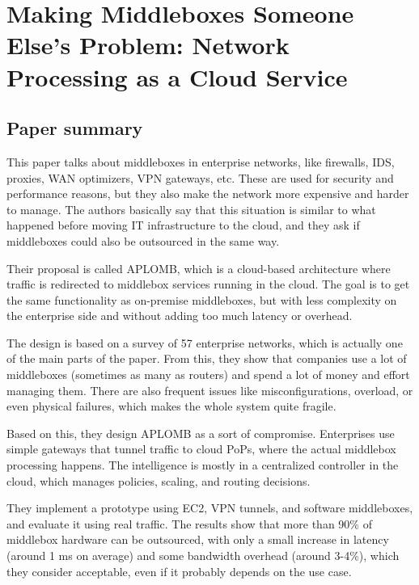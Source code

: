 \documentclass[a4paper, 12pt]{article}
\begin{document}
\section*{Making Middleboxes Someone Else's Problem:
Network Processing as a Cloud Service}
\subsection{Paper summary}

This paper talks about middleboxes in enterprise networks, like firewalls, IDS, proxies, WAN optimizers, VPN gateways, etc. These are used for security and performance reasons, but they also make the network more expensive and harder to manage. The authors basically say that this situation is similar to what happened before moving IT infrastructure to the cloud, and they ask if middleboxes could also be outsourced in the same way.

Their proposal is called APLOMB, which is a cloud-based architecture where traffic is redirected to middlebox services running in the cloud. The goal is to get the same functionality as on-premise middleboxes, but with less complexity on the enterprise side and without adding too much latency or overhead.

The design is based on a survey of 57 enterprise networks, which is actually one of the main parts of the paper. From this, they show that companies use a lot of middleboxes (sometimes as many as routers) and spend a lot of money and effort managing them. There are also frequent issues like misconfigurations, overload, or even physical failures, which makes the whole system quite fragile.

Based on this, they design APLOMB as a sort of compromise. Enterprises use simple gateways that tunnel traffic to cloud PoPs, where the actual middlebox processing happens. The intelligence is mostly in a centralized controller in the cloud, which manages policies, scaling, and routing decisions.

They implement a prototype using EC2, VPN tunnels, and software middleboxes, and evaluate it using real traffic. The results show that more than 90\% of middlebox hardware can be outsourced, with only a small increase in latency (around 1 ms on average) and some bandwidth overhead (around 3-4\%), which they consider acceptable, even if it probably depends on the use case.
\end{document}
